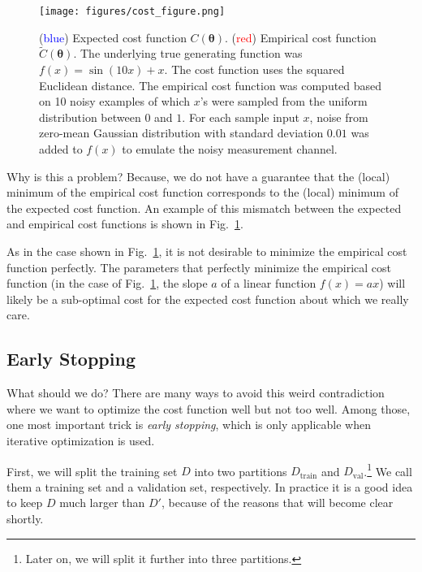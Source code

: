 \documentclass{report}
\newcommand{\vects}[1]{\boldsymbol{#1}}
\newcommand{\TT}[0]{\vects{\theta}}
\newcommand{\train}{\text{train}}
\newcommand{\val}{\text{val}}
\begin{document}
\begin{figure}
    \centering
    \begin{minipage}{0.6\textwidth}
        \texttt{[image: figures/cost\_figure.png]}
    \end{minipage}
    \hfill
    \begin{minipage}{0.39\textwidth}
        \caption{(\textcolor{blue}{blue}) Expected cost function $C(\TT)$.
            (\textcolor{red}{red}) Empirical cost function $\tilde{C}(\TT)$.
            The underlying true generating function was $f(x) = \sin(10x) + x$.
            The cost function uses the squared Euclidean distance.
            The empirical cost function was computed based on 10 noisy
            examples of which $x$'s were sampled from the uniform distribution
        between $0$ and $1$. For each sample input $x$, noise from zero-mean Gaussian
    distribution with standard deviation $0.01$ was added to $f(x)$ to emulate
the noisy measurement channel.}
        \label{fig:cost}
    \end{minipage}
\end{figure}

Why is this a problem? Because, we do not have a guarantee that the (local)
minimum of the empirical cost function corresponds to the (local) minimum of the
expected cost function. An example of this mismatch between the expected and
empirical cost functions is shown in Fig.~\ref{fig:cost}.

As in the case shown in Fig.~\ref{fig:cost}, it is not desirable to minimize the
empirical cost function perfectly. The parameters that perfectly minimize the
empirical cost function (in the case of
Fig.~\ref{fig:cost}, the slope $a$ of a linear function $f(x) = a x$) will
likely be a sub-optimal cost for the expected cost function about which we
really care. 

\subsection{Early Stopping}
What should we do? There are many ways to avoid this weird contradiction where
we want to optimize the cost function well but not too well. Among those, one
most important trick is {\em early stopping}, which is only applicable when
iterative optimization is used.

First, we will split the training set $D$ into two partitions $D_{\train}$ and
$D_{\val}$.\footnote{
    Later on, we will split it further into three partitions.
}
We call them a training set and a validation set, respectively. In practice it
is a good idea to keep $D$ much larger than $D'$, because of the reasons that
will become clear shortly.
\end{document}
